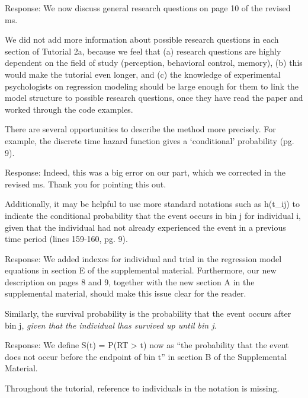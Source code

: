 \documentclass[
]{article}
\renewenvironment{quote}{\begin{leftbar}}{\end{leftbar}}
\begin{document}
Response: We now discuss general research questions on page 10 of the
revised ms.

We did not add more information about possible research questions in
each section of Tutorial 2a, because we feel that (a) research questions
are highly dependent on the field of study (perception, behavioral
control, memory), (b) this would make the tutorial even longer, and (c)
the knowledge of experimental psychologists on regression modeling
should be large enough for them to link the model structure to possible
research questions, once they have read the paper and worked through the
code examples.

\begin{quote}
There are several opportunities to describe the method more precisely.
For example, the discrete time hazard function gives a `conditional'
probability (pg. 9).
\end{quote}

Response: Indeed, this was a big error on our part, which we corrected
in the revised ms. Thank you for pointing this out.

\begin{quote}
Additionally, it may be helpful to use more standard notations such as
h(t\_ij) to indicate the conditional probability that the event occurs
in bin j for individual i, given that the individual had not already
experienced the event in a previous time period (lines 159-160, pg. 9).
\end{quote}

Response: We added indexes for individual and trial in the regression
model equations in section E of the supplemental material. Furthermore,
our new description on pages 8 and 9, together with the new section A in
the supplemental material, should make this issue clear for the reader.

\begin{quote}
Similarly, the survival probability is the probability that the event
occurs after bin j, \emph{given that the individual lhas survived up
until bin j}.
\end{quote}

Response: We define S(t) = P(RT \textgreater{} t) now as ``the
probability that the event does not occur before the endpoint of bin t''
in section B of the Supplemental Material.

\begin{quote}
Throughout the tutorial, reference to individuals in the notation is
missing.
\end{quote}
\end{document}
